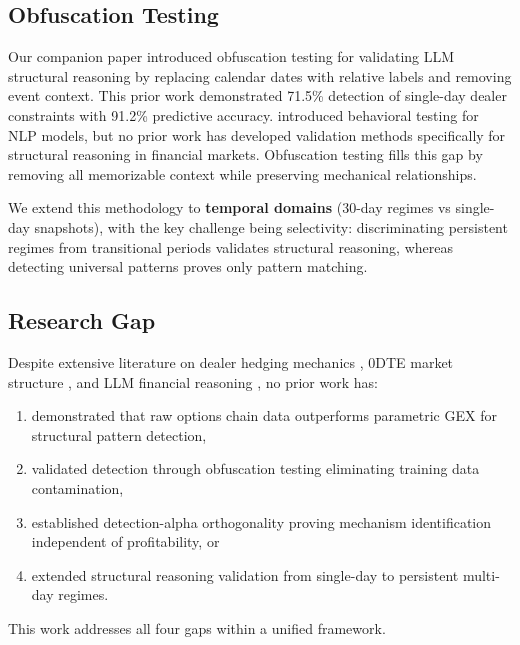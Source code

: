 \subsection{Obfuscation Testing}

Our companion paper \citep{regan2025obfuscation} introduced obfuscation testing for validating LLM structural reasoning by replacing calendar dates with relative labels and removing event context. This prior work demonstrated 71.5\% detection of single-day dealer constraints with 91.2\% predictive accuracy. \citet{ribeiro2020beyond} introduced behavioral testing for NLP models, but no prior work has developed validation methods specifically for structural reasoning in financial markets. Obfuscation testing fills this gap by removing all memorizable context while preserving mechanical relationships.

We extend this methodology to \textbf{temporal domains} (30-day regimes vs single-day snapshots), with the key challenge being selectivity: discriminating persistent regimes from transitional periods validates structural reasoning, whereas detecting universal patterns proves only pattern matching.

\subsection{Research Gap}

Despite extensive literature on dealer hedging mechanics \citep{ni2005stock,garleanu2009demand}, 0DTE market structure \citep{dim2023odtes,adams2025zerodte}, and LLM financial reasoning \citep{lopez2023can,lopezlira2025memorization}, no prior work has:
\begin{enumerate}
\item demonstrated that raw options chain data outperforms parametric GEX for structural pattern detection,
\item validated detection through obfuscation testing eliminating training data contamination,
\item established detection-alpha orthogonality proving mechanism identification independent of profitability, or
\item extended structural reasoning validation from single-day to persistent multi-day regimes.
\end{enumerate}
This work addresses all four gaps within a unified framework.
